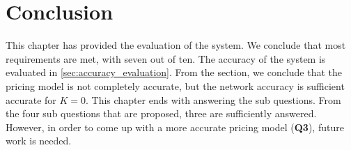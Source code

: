 \section{Conclusion}
This chapter has provided the evaluation of the system. We conclude that most requirements are met, with seven out of ten. The accuracy of the system is evaluated in \autoref{sec:accuracy_evaluation}. From the section, we conclude that the pricing model is not completely accurate, but the network accuracy is sufficient accurate for $K = 0$. This chapter ends with answering the sub questions. From the four sub questions that are proposed, three are sufficiently answered. However, in order to come up with a more accurate pricing model (\textbf{Q3}), future work is needed.